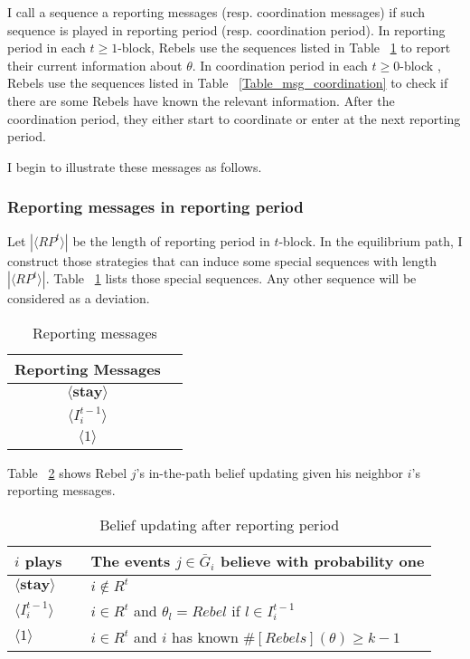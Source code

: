 \documentclass[12pt,letterpaper]{article}
\theoremstyle{definition}
\theoremstyle{remark}
\theoremstyle{claim}
\begin{document}
I call a sequence a {reporting messages} ({resp.} {coordination messages}) if such sequence is played in reporting period ({resp.} coordination period). In reporting period in each $t\geq 1$-block, Rebels use the sequences listed in Table ~\ref{Table_msg_reporting} to report their current information about $\theta$. In coordination period in each $t\geq 0$-block , Rebels use the sequences listed in Table ~\ref{Table_msg_coordination} to check if there are some Rebels have known the relevant information. After the coordination period, they either start to coordinate or enter at the next reporting period. 

I begin to illustrate these messages as follows.



\subsubsection*{Reporting messages in reporting period}

Let $|\langle RP^t \rangle|$ be the length of reporting period in $t$-block.  In the equilibrium path, I construct those strategies that can induce some special sequences with length $|\langle RP^t \rangle|$. Table ~\ref{Table_msg_reporting} lists those special sequences. Any other sequence will be considered as a deviation. 

\begin{table}[ht]
\caption{Reporting messages}
\label{Table_msg_reporting}
\begin{center}
\begin{tabular}{c c }
Reporting Messages 		&   \\
\hline
$\langle  \textbf{stay} \rangle$ 	& 	 \\
$\langle  {I^{t-1}_i} \rangle$ 		&   \\
$\langle 1 \rangle$ 		             &    
\end{tabular}
\end{center}
\end{table}

Table ~\ref{Table_blf_up_reporting} shows Rebel $j$'s in-the-path belief updating given his neighbor $i$'s reporting messages.


\begin{table}[ht]
\caption{Belief updating after reporting period}
\label{Table_blf_up_reporting}
\begin{center}
\begin{tabular}{l c l}
$i$ plays 		&  			& The events $j\in \bar{G}_i$ believe with probability one  \\
\hline
$\langle  \textbf{stay} \rangle$ 	& 			    & $i\notin R^t$  \\
$\langle  {I^{t-1}_i} \rangle$ 		&  			& $i\in R^t$ and $\theta_l=Rebel$ if $l\in I^{t-1}_i$      \\
$\langle 1 \rangle$ 		             &  			& $i\in R^t$ and $i$ has known $\#[Rebels](\theta)\geq k-1$ \\
\end{tabular}
\end{center}
\end{table}
\end{document}
